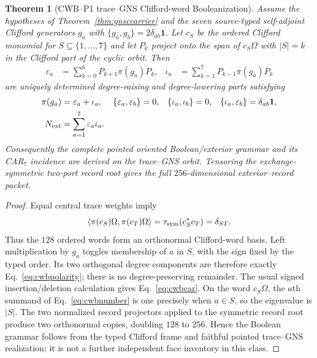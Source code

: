 \documentclass[11pt,a4paper]{article}
\newtheorem{theorem}[definition]{Theorem}
\theoremstyle{remark}
\newcommand{\id}{\mathbf 1}
\begin{document}
\begin{theorem}[CWB--P1 trace--GNS Clifford-word Booleanization]
Assume the hypotheses of Theorem~\ref{thm:gnsccarrier} and the seven
source-typed self-adjoint Clifford generators $g_a$ with
$\{g_a,g_b\}=2\delta_{ab}\id$.  Let $c_S$ be the ordered Clifford monomial
for $S\subseteq\{1,\ldots,7\}$ and let $P_k$ project onto the span of
$c_S\Omega$ with $|S|=k$ in the Clifford part of the cyclic orbit.  Then
\begin{align}
 \varepsilon_a&=\sum_{k=0}^{6}P_{k+1}\pi(g_a)P_k,
 &\iota_a&=\sum_{k=1}^{7}P_{k-1}\pi(g_a)P_k
 \label{eq:cwbpolarity}
\end{align}
are uniquely determined degree-raising and degree-lowering parts satisfying
\begin{align}
 \pi(g_a)&=\varepsilon_a+\iota_a,
 &\{\varepsilon_a,\varepsilon_b\}&=0,
 &\{\iota_a,\iota_b\}&=0,
 &\{\iota_a,\varepsilon_b\}&=\delta_{ab}\id,
 \label{eq:cwbcar}\\
 N_{\rm ext}&=\sum_{a=1}^{7}\varepsilon_a\iota_a.
 \label{eq:cwbnumber}
\end{align}
Consequently the complete pointed oriented Boolean/exterior grammar and its
CAR$_7$ incidence are derived on the trace--GNS orbit.  Tensoring the
exchange-symmetric two-port record root gives the full $256$-dimensional
exterior--record packet.
\label{thm:cwbbooleanization}
\end{theorem}

\begin{proof}
Equal central trace weights imply
\begin{equation}
 \langle\pi(c_S)\Omega,\pi(c_T)\Omega\rangle
 =\tau_{\rm sym}(c_S^*c_T)=\delta_{ST}.
 \label{eq:cwbgram}
\end{equation}
Thus the $128$ ordered words form an orthonormal Clifford-word basis.  Left
multiplication by $g_a$ toggles membership of $a$ in $S$, with the sign fixed
by the typed order.  Its two orthogonal degree components are therefore
exactly Eq.~\eqref{eq:cwbpolarity}; there is no degree-preserving remainder.
The usual signed insertion/deletion calculation gives
Eq.~\eqref{eq:cwbcar}.  On the word $c_S\Omega$, the $a$th summand of
Eq.~\eqref{eq:cwbnumber} is one precisely when $a\in S$, so the eigenvalue is
$|S|$.  The two normalized record projectors applied to the symmetric record
root produce two orthonormal copies, doubling $128$ to $256$.  Hence the
Boolean grammar follows from the typed Clifford frame and faithful pointed
trace--GNS realization; it is not a further independent face inventory in
this class.
\end{proof}
\end{document}
